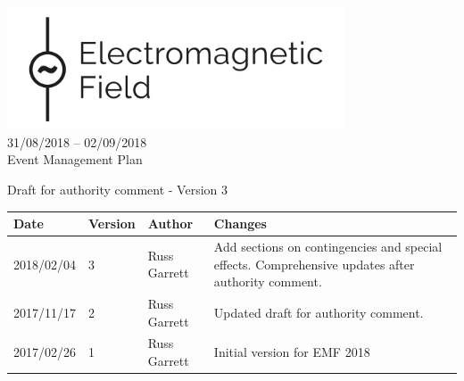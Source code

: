 

\newcommand{\st}{\textsuperscript{st} }
\newcommand{\nd}{\textsuperscript{nd} }
\renewcommand{\th}{\textsuperscript{th} }
\newcommand{\rd}{\textsuperscript{rd} }
\newcommand{\sq}{\textsuperscript{2}}




\begin{titlepage}
\thispagestyle{empty}
\begin{center}
    \includegraphics[width=10cm]{../resources/emf-logo.png}\\[24pt]
    {\LARGE 31/08/2018 -- 02/09/2018} \\[48pt]

    {\Large Event Management Plan}

    Draft for authority comment - Version 3

    \vfill

    \begin{tabular}{l | l | l | p{10cm}}
      Date & Version & Author & Changes \\
      \hline
      2018/02/04 & 3 & Russ Garrett & Add sections on contingencies and special effects.
                                      Comprehensive updates after authority comment. \\
      2017/11/17 & 2 & Russ Garrett & Updated draft for authority comment. \\
      2017/02/26 & 1 & Russ Garrett & Initial version for EMF 2018 \\
    \end{tabular}
\end{center}
\end{titlepage}
\setcounter{page}{2}

\tableofcontents

\newpage



